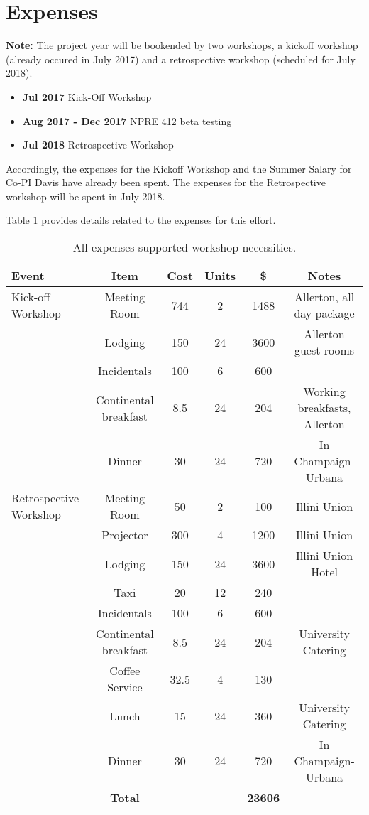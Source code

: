 \documentclass[11pt]{article}
\begin{document}
          \section{Expenses}
          \textbf{Note:} The project year will be bookended by two workshops, a kickoff 
          workshop (already occured in July 2017) and a retrospective workshop 
          (scheduled for July 2018). 

          \begin{itemize}
                  \item \textbf{Jul 2017} Kick-Off Workshop
                  \item \textbf{Aug 2017 - Dec 2017} NPRE 412 beta testing
                  \item \textbf{Jul 2018} Retrospective Workshop
          \end{itemize}

          
          Accordingly, the expenses for the Kickoff Workshop and the Summer Salary for Co-PI 
          Davis have already been spent. The expenses for the Retrospective 
          workshop will be spent in July 2018.

          Table \ref{tab:budget} provides details related to the expenses for 
          this effort.

\begin{table}[h!]
        \begin{tabularx}{\textwidth}{|X|c|c|c|c|c|}
        \hline
        \textbf{Event} & \textbf{Item} & \textbf{Cost} & \textbf{Units} & \textbf{\$} & \textbf{Notes}\\ 
        \hline
Kick-off Workshop&Meeting Room&744&2&1488&Allerton, all day package\\
&Lodging&150&24&3600&Allerton guest rooms\\
&Incidentals&100&6&600&\\
&Continental breakfast&8.5&24&204&Working breakfasts, Allerton\\
&Dinner&30&24&720&In Champaign-Urbana\\
\hline
Retrospective Workshop&Meeting Room&50&2&100&Illini Union\\
&Projector&300&4&1200&Illini Union\\
&Lodging&150&24&3600&Illini Union Hotel\\
&Taxi&20&12&240&\\
&Incidentals&100&6&600&\\
&Continental breakfast&8.5&24&204&University Catering\\
&Coffee Service&32.5&4&130&\\
&Lunch&15&24&360&University Catering\\
&Dinner&30&24&720&In Champaign-Urbana\\
        \hline
        &\textbf{Total}&&&\textbf{23606}&\\
        \hline
\end{tabularx}
\caption{All expenses supported workshop 
necessities.}
\label{tab:budget}
\end{table}
\end{document}
